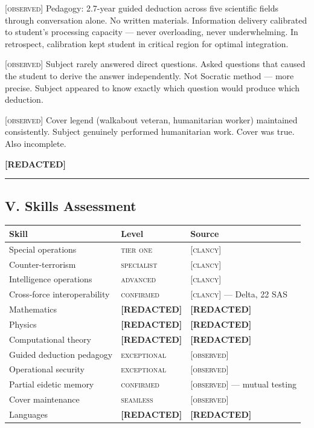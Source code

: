 \textsc{[observed]} Pedagogy: 2.7-year guided deduction across five scientific fields through conversation alone. No written materials. Information delivery calibrated to student's processing capacity --- never overloading, never underwhelming. In retrospect, calibration kept student in critical region for optimal integration.

\textsc{[observed]} Subject rarely answered direct questions. Asked questions that caused the student to derive the answer independently. Not Socratic method --- more precise. Subject appeared to know exactly which question would produce which deduction.

\textsc{[observed]} Cover legend (walkabout veteran, humanitarian worker) maintained consistently. Subject genuinely performed humanitarian work. Cover was true. Also incomplete.

\textbf{[REDACTED]}

\vspace{1cm}\hrule\vspace{1cm}

\subsection*{V. Skills Assessment}
\label{interlude:skills-assessment-2}

{%
\small
\begin{tabular}{p{4cm} p{3.5cm} p{6cm}}
\hline
\textbf{Skill} & \textbf{Level} & \textbf{Source} \\
\hline
Special operations & \textsc{tier one} & \textsc{[clancy]} \\
Counter-terrorism & \textsc{specialist} & \textsc{[clancy]} \\
Intelligence operations & \textsc{advanced} & \textsc{[clancy]} \\
Cross-force interoperability & \textsc{confirmed} & \textsc{[clancy]} --- Delta, 22 SAS \\
Mathematics & \textbf{[REDACTED]} & \textbf{[REDACTED]} \\
Physics & \textbf{[REDACTED]} & \textbf{[REDACTED]} \\
Computational theory & \textbf{[REDACTED]} & \textbf{[REDACTED]} \\
Guided deduction pedagogy & \textsc{exceptional} & \textsc{[observed]} \\
Operational security & \textsc{exceptional} & \textsc{[observed]} \\
Partial eidetic memory & \textsc{confirmed} & \textsc{[observed]} --- mutual testing \\
Cover maintenance & \textsc{seamless} & \textsc{[observed]} \\
Languages & \textbf{[REDACTED]} & \textbf{[REDACTED]} \\
\hline
\end{tabular}
}%

